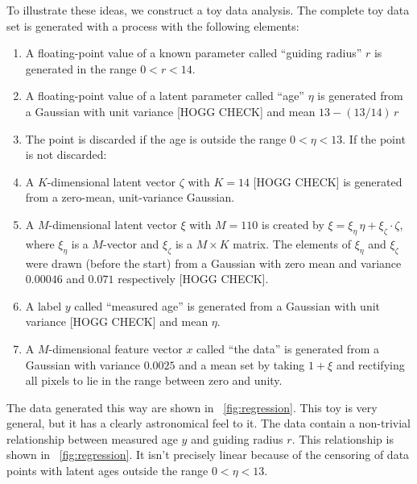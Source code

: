 \documentclass[11pt]{article}
\begin{document}
To illustrate these ideas, we construct a toy data analysis.
The complete toy data set is generated with a process with the following elements:
\begin{enumerate}\setlength{\itemsep}{0in}
    \item A floating-point value of a known parameter called ``guiding radius'' $r$ is generated in the range $0<r<14$.
    \item A floating-point value of a latent parameter called ``age'' $\eta$ is generated from a Gaussian with unit variance [HOGG CHECK] and mean $13 - (13/14)\,r$
    \item The point is discarded if the age is outside the range $0<\eta<13$. If the point is not discarded:
    \item A $K$-dimensional latent vector $\zeta$ with $K=14$ [HOGG CHECK] is generated from a zero-mean, unit-variance Gaussian.
    \item A $M$-dimensional latent vector $\xi$ with $M=110$ is created by $\xi = \xi_\eta\,\eta + \xi_\zeta\cdot\zeta$, where $\xi_\eta$ is a $M$-vector and $\xi_\zeta$ is a $M\times K$ matrix. The elements of $\xi_\eta$ and $\xi_\zeta$ were drawn (before the start) from a Gaussian with zero mean and variance $0.00046$ and $0.071$ respectively [HOGG CHECK].
    \item A label $y$ called ``measured age'' is generated from a Gaussian with unit variance [HOGG CHECK] and mean $\eta$.
    \item A $M$-dimensional feature vector $x$ called ``the data'' is generated from a Gaussian with variance $0.0025$ and a mean set by taking $1 + \xi$ and rectifying all pixels to lie in the range between zero and unity.
\end{enumerate}
The data generated this way are shown in \figurename~\ref{fig:regression}.
This toy is very general, but it has a clearly astronomical feel to it.
The data contain a non-trivial relationship between measured age $y$ and guiding radius $r$.
This relationship is shown in \figurename~\ref{fig:regression}.
It isn't precisely linear because of the censoring of data points with latent ages outside the range $0<\eta<13$.
\end{document}

